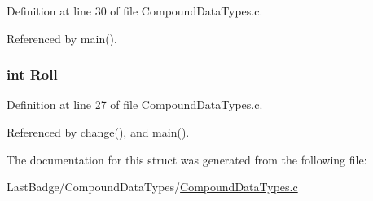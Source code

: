 Definition at line 30 of file Compound\+Data\+Types.\+c.



Referenced by main().

\hypertarget{structmember_abf08303c7c1c86949317530985b66f65}{
\subsubsection[{Roll}]{\setlength{\rightskip}{0pt plus 5cm}int Roll}}\label{structmember_abf08303c7c1c86949317530985b66f65}


Definition at line 27 of file Compound\+Data\+Types.\+c.



Referenced by change(), and main().



The documentation for this struct was generated from the following file\+:\begin{DoxyCompactItemize}
\item 
Last\+Badge/\+Compound\+Data\+Types/\hyperlink{_compound_data_types_8c}{Compound\+Data\+Types.\+c}\end{DoxyCompactItemize}
